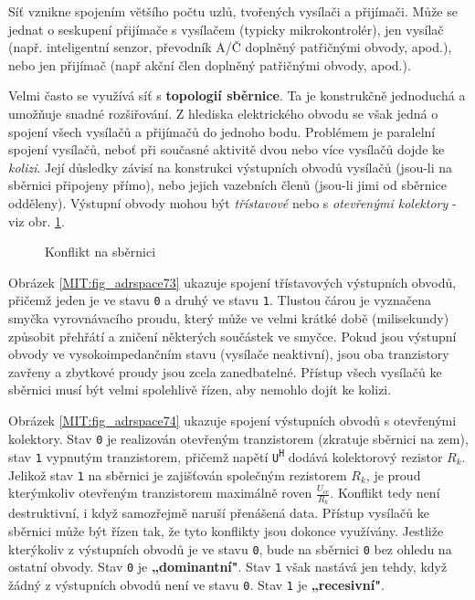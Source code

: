         Síť vznikne spojením většího počtu uzlů, tvořených vysílači a přijímači. Může se jednat o
        seskupení přijímače s vysílačem (typicky mikrokontrolér), jen vysílač (např. inteligentní
        senzor, převodník A/Č doplněný patřičnými obvody, apod.), nebo jen přijímač (např akční člen
        doplněný patřičnými obvody, apod.).
        
        Velmi často se využívá síť s \textbf{topologií sběrnice}. Ta je konstrukčně jednoduchá a
        umožňuje snadné rozšiřování. Z hlediska elektrického obvodu se však jedná o spojení všech
        vysílačů a přijímačů do jednoho bodu. Problémem je paralelní spojení vysílačů, neboť při
        současné aktivitě dvou nebo více vysílačů dojde ke \emph{kolizi}. Její důsledky závisí na
        konstrukci výstupních obvodů vysílačů (jsou-li na sběrnici připojeny přímo), nebo jejich
        vazebních členů (jsou-li jimi od sběrnice odděleny). Výstupní obvody mohou být
        \emph{třístavové} nebo s \emph{otevřenými kolektory} -viz obr. \ref{MIT:fig_sbernice7374}.

        \begin{figure}[ht!]
          \centering  
            {}
            {}
          \caption{Konflikt na sběrnici}
          \label{MIT:fig_sbernice7374}
        \end{figure}
        
        Obrázek \ref{MIT:fig_adrspace73} ukazuje spojení třístavových výstupních obvodů, přičemž
        jeden je ve stavu \texttt{0} a druhý ve stavu \texttt{1}. Tlustou čárou je vyznačena smyčka
        vyrovnávacího proudu, který může ve velmi krátké době (milisekundy) způsobit přehřátí a
        zničení některých součástek ve smyčce. Pokud jsou výstupní obvody ve vysokoimpedančním stavu
        (vysílače neaktivní), jsou oba tranzistory zavřeny a zbytkové proudy jsou zcela
        zanedbatelné. Přístup všech vysílačů ke sběrnici  musí být velmi spolehlivě řízen, aby
        nemohlo dojít ke kolizi.
        
        Obrázek \ref{MIT:fig_adrspace74} ukazuje spojení výstupních obvodů s otevřenými kolektory.
        Stav \texttt{0} je realizován otevřeným tranzistorem (zkratuje sběrnici na zem), stav
        \texttt{1} vypnutým tranzistorem, přičemž napětí \texttt{U\textsuperscript{H}} dodává
        kolektorový rezistor \(R_k\).  Jelikož stav \texttt{1} na sběrnici je zajišťován společným
        rezistorem \(R_k\), je proud kterýmkoliv  otevřeným tranzistorem maximálně roven
        \(\frac{U_{cc}}{R_k}\). Konflikt tedy není destruktivní, i když samozřejmě naruší přenášená
        data. Přístup vysílačů ke sběrnici může být řízen tak, že tyto konflikty jsou dokonce
        využívány. Jestliže kterýkoliv z výstupních obvodů je ve stavu \texttt{0}, bude na sběrnici
        \texttt{0} bez ohledu na ostatní obvody. Stav \texttt{0} je \textbf{„dominantní"}. Stav
        \texttt{1} však nastává jen tehdy, když žádný z výstupních obvodů není ve stavu \texttt{0}.
        Stav \texttt{1} je \textbf{„recesivní"}.
        
